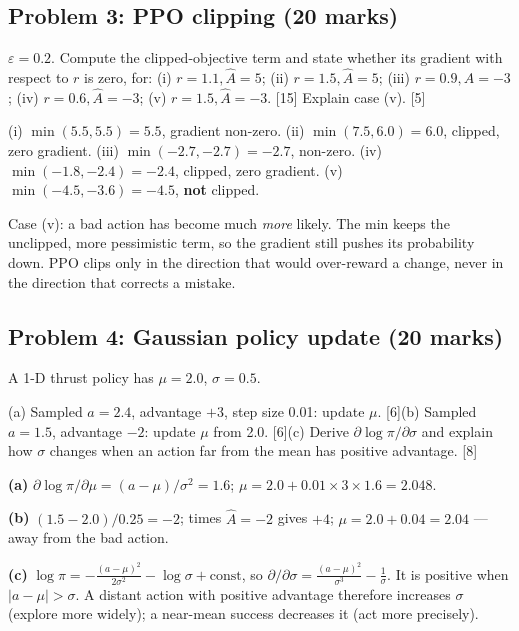 \documentclass[11pt]{article}
\begin{document}
\subsection{Problem 3: PPO clipping \normalfont\small\color{GreyN}(20 marks)}

\begin{prob}$\varepsilon=0.2$. Compute the clipped-objective term and state whether its gradient with respect to $r$ is zero, for: (i) $r=1.1,\hat A=5$; (ii) $r=1.5,\hat A=5$; (iii) $r=0.9,\hat A=-3$; (iv) $r=0.6,\hat A=-3$; (v) $r=1.5,\hat A=-3$. [15] Explain case (v). [5]\end{prob}

\begin{soln}(i) $\min(5.5,5.5)=5.5$, gradient non-zero. (ii) $\min(7.5,6.0)=\mathbf{6.0}$, clipped, zero gradient. (iii) $\min(-2.7,-2.7)=-2.7$, non-zero. (iv) $\min(-1.8,-2.4)=\mathbf{-2.4}$, clipped, zero gradient. (v) $\min(-4.5,-3.6)=\mathbf{-4.5}$, \textbf{not} clipped.

Case (v): a bad action has become much \textit{more} likely. The min keeps the unclipped, more pessimistic term, so the gradient still pushes its probability down. PPO clips only in the direction that would over-reward a change, never in the direction that corrects a mistake.\end{soln}

\subsection{Problem 4: Gaussian policy update \normalfont\small\color{GreyN}(20 marks)}

\begin{prob}A 1-D thrust policy has $\mu=2.0$, $\sigma=0.5$.

(a) Sampled $a=2.4$, advantage $+3$, step size 0.01: update $\mu$. [6]\newline (b) Sampled $a=1.5$, advantage $-2$: update $\mu$ from 2.0. [6]\newline (c) Derive $\partial\log\pi/\partial\sigma$ and explain how $\sigma$ changes when an action far from the mean has positive advantage. [8]\end{prob}

\begin{soln}\textbf{(a)} $\partial\log\pi/\partial\mu=(a-\mu)/\sigma^2=1.6$; $\mu=2.0+0.01\times3\times1.6=\mathbf{2.048}$.

\textbf{(b)} $(1.5-2.0)/0.25=-2$; times $\hat A=-2$ gives $+4$; $\mu=2.0+0.04=\mathbf{2.04}$ --- away from the bad action.

\textbf{(c)} $\log\pi=-\frac{(a-\mu)^2}{2\sigma^2}-\log\sigma+\text{const}$, so $\partial/\partial\sigma=\frac{(a-\mu)^2}{\sigma^3}-\frac1\sigma$. It is positive when $|a-\mu|>\sigma$. A distant action with positive advantage therefore increases $\sigma$ (explore more widely); a near-mean success decreases it (act more precisely).\end{soln}
\end{document}
